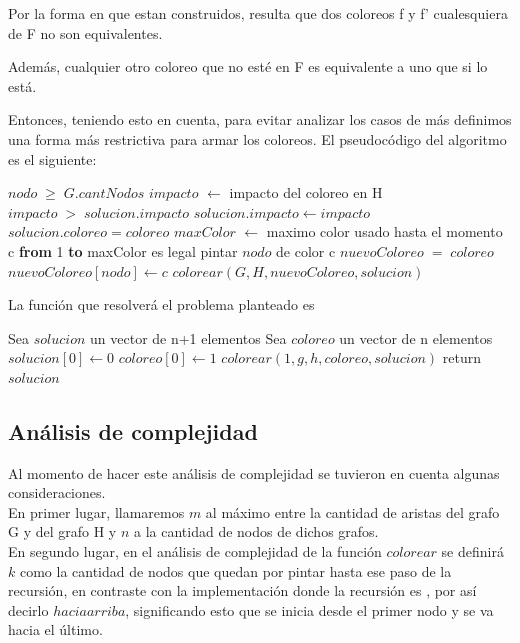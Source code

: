 Por la forma en que estan construidos, resulta que dos coloreos f y f' cualesquiera de F no son equivalentes. 

Adem\'as, cualquier otro coloreo que no est\'e en F es equivalente a uno que si lo est\'a.

Entonces, teniendo esto en cuenta, para evitar analizar los casos de m\'as definimos una forma m\'as restrictiva para armar los coloreos.
El pseudocódigo del algoritmo es el siguiente:

\begin{algorithm}[H]
\caption{} 
\begin{codebox}

\li \If $nodo \; \geq \; G.cantNodos$  \Do
\li	$impacto$ $\gets$ impacto del coloreo en H
\li		\If $impacto\; > \; solucion.impacto$ \Do
\li			$solucion.impacto \gets impacto$
\li			$solucion.coloreo = coloreo$
			\End
	\End
\li \Else \Do
\li		$maxColor$ $\gets$ maximo color usado hasta el momento 	
\li		\For c \textbf{from} 1 \textbf{to} maxColor \Do
\li			\If es legal pintar $nodo$ de color c \Do
\li					$nuevoColoreo \; = \; coloreo$
\li         $nuevoColoreo[nodo] \gets c$
\li         $colorear(G, H, nuevoColoreo, solucion)$
             \End
         \End
\End
\end{codebox}
\end{algorithm}


La funci\'on que resolver\'a el problema planteado es

\begin{algorithm}[H]
\caption{} 
\begin{codebox}
\li Sea $solucion$ un vector de n+1 elementos
\li Sea $coloreo$ un vector de n elementos
\li $solucion[0] \gets 0$
\li $coloreo[0] \gets 1$
\li $colorear(1,g,h,coloreo,solucion)$
\li	return $solucion$
\End
\end{codebox}
\end{algorithm}



\subsection{Análisis de complejidad}

\indent Al momento de hacer este análisis de complejidad se tuvieron en cuenta algunas consideraciones.\\
\indent En primer lugar, llamaremos $m$ al máximo entre la cantidad de aristas del grafo G y del grafo H  y $n$ a la cantidad de nodos de dichos grafos.\\
\indent En segundo lugar, en el análisis de complejidad de la función $colorear$ se definirá $k$ como la cantidad de nodos que quedan por pintar hasta ese paso de la recursión, en contraste con la implementación donde la recursión es , por así decirlo $hacia arriba$, significando esto que se inicia desde el primer nodo y se va hacia el último.\\

